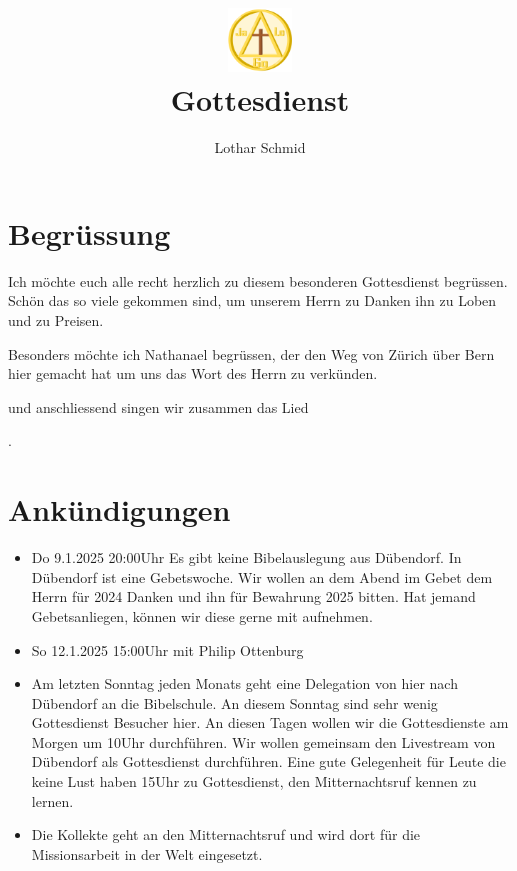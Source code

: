 \documentclass{../inc/mybib}
\title{\includegraphics[height=48pt]{../assets/images/logo.png}\\Gottesdienst}
\author{Lothar Schmid}
\begin{document}
\maketitle
\section{Begrüssung}

Ich möchte euch alle recht herzlich zu diesem besonderen Gottesdienst begrüssen. Schön das so viele gekommen sind, um unserem Herrn zu Danken ihn zu Loben und zu Preisen.

Besonders möchte ich Nathanael begrüssen, der den Weg von Zürich über Bern hier gemacht hat um uns das Wort des Herrn zu verkünden. 

\noindent
\beten{} und anschliessend singen wir zusammen das Lied

\noindent
{}.

\section{Ankündigungen}
\begin{itemize}
    \item {} Do 9.1.2025 20:00Uhr Es gibt keine Bibelauslegung aus Dübendorf. In Dübendorf ist eine Gebetswoche. Wir wollen an dem Abend im Gebet dem Herrn für 2024 Danken und ihn für Bewahrung 2025 bitten. Hat jemand Gebetsanliegen, können wir diese gerne mit aufnehmen.
    \item {} So 12.1.2025 15:00Uhr mit Philip Ottenburg
    \item {} Am letzten Sonntag jeden Monats geht eine Delegation von hier nach Dübendorf an die Bibelschule. An diesem Sonntag sind sehr wenig Gottesdienst Besucher hier. An diesen Tagen wollen wir die Gottesdienste am Morgen um 10Uhr durchführen. Wir wollen gemeinsam den Livestream von Dübendorf als Gottesdienst durchführen. Eine gute Gelegenheit für Leute die keine Lust haben 15Uhr zu Gottesdienst, den Mitternachtsruf kennen zu lernen.
    \item {} Die Kollekte geht an den Mitternachtsruf und wird dort für die Missionsarbeit in der Welt eingesetzt.
\end{itemize}
\end{document}
